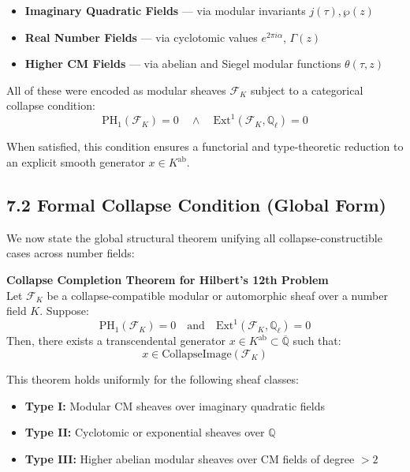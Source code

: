 \documentclass[11pt]{article}
\begin{document}
\begin{itemize}
    \item \textbf{Imaginary Quadratic Fields} — via modular invariants \( j(\tau), \wp(z) \)
    \item \textbf{Real Number Fields} — via cyclotomic values \( e^{2\pi i \alpha} \), \( \Gamma(z) \)
    \item \textbf{Higher CM Fields} — via abelian and Siegel modular functions \( \theta(\tau, z) \)
\end{itemize}

All of these were encoded as modular sheaves \( \mathcal{F}_K \) subject to a categorical collapse condition:
\[
\mathrm{PH}_1(\mathcal{F}_K) = 0 \quad \wedge \quad \mathrm{Ext}^1(\mathcal{F}_K, \mathbb{Q}_\ell) = 0
\]

When satisfied, this condition ensures a functorial and type-theoretic reduction to an explicit smooth generator \( x \in K^{\mathrm{ab}} \).

\subsection{7.2 Formal Collapse Condition (Global Form)}
\label{subsec:collapse-completion-global}

We now state the global structural theorem unifying all collapse-constructible cases across number fields:

\begin{center}
\textbf{Collapse Completion Theorem for Hilbert’s 12th Problem}  
\\[0.5em]
Let \( \mathcal{F}_K \) be a collapse-compatible modular or automorphic sheaf over a number field \( K \).  
Suppose:
\[
\mathrm{PH}_1(\mathcal{F}_K) = 0 \quad \text{and} \quad \mathrm{Ext}^1(\mathcal{F}_K, \mathbb{Q}_\ell) = 0
\]
Then, there exists a transcendental generator \( x \in K^{\mathrm{ab}} \subset \overline{\mathbb{Q}} \) such that:
\[
x \in \text{CollapseImage}(\mathcal{F}_K)
\]
\end{center}

This theorem holds uniformly for the following sheaf classes:
\begin{itemize}
    \item \textbf{Type I:} Modular CM sheaves over imaginary quadratic fields
    \item \textbf{Type II:} Cyclotomic or exponential sheaves over \( \mathbb{Q} \)
    \item \textbf{Type III:} Higher abelian modular sheaves over CM fields of degree \( > 2 \)
\end{itemize}
\end{document}
